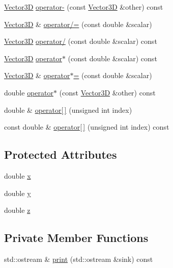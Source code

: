 \begin{DoxyCompactItemize}
\item 
\mbox{\hyperlink{classVector3D}{Vector3D}} \mbox{\hyperlink{classVector3D_a2d77fde2d4f484a639cb4dfd500c3540}{operator-\/}} (const \mbox{\hyperlink{classVector3D}{Vector3D}} \&other) const
\item 
\mbox{\hyperlink{classVector3D}{Vector3D}} \& \mbox{\hyperlink{classVector3D_ac916f188b52f903688d475d8aa6c17fa}{operator/=}} (const double \&scalar)
\item 
\mbox{\hyperlink{classVector3D}{Vector3D}} \mbox{\hyperlink{classVector3D_a1cc502ec8678ad1b6655dba2b840642c}{operator/}} (const double \&scalar) const
\item 
\mbox{\hyperlink{classVector3D}{Vector3D}} \mbox{\hyperlink{classVector3D_ad27fdc97ad2e142ccb6261759e481b1f}{operator$\ast$}} (const double \&scalar) const
\item 
\mbox{\hyperlink{classVector3D}{Vector3D}} \& \mbox{\hyperlink{classVector3D_a30e301e07305ca5eb90d33296d53dc04}{operator$\ast$=}} (const double \&scalar)
\item 
double \mbox{\hyperlink{classVector3D_a4086e97bd4845c0934a023d59b71ebc1}{operator$\ast$}} (const \mbox{\hyperlink{classVector3D}{Vector3D}} \&other) const
\item 
double \& \mbox{\hyperlink{classVector3D_a4dcadc12bb40086b075c9559b78ed8d2}{operator\mbox{[}$\,$\mbox{]}}} (unsigned int index)
\item 
const double \& \mbox{\hyperlink{classVector3D_acd83f7d07b4730cce2031ae0576095ac}{operator\mbox{[}$\,$\mbox{]}}} (unsigned int index) const
\end{DoxyCompactItemize}
\subsection*{Protected Attributes}
\begin{DoxyCompactItemize}
\item 
double \mbox{\hyperlink{classVector3D_a3c086dfccfc57dd996e9b8600098a430}{x}}
\item 
double \mbox{\hyperlink{classVector3D_adcec384756103d26d1181e45d5a0fd78}{y}}
\item 
double \mbox{\hyperlink{classVector3D_a7321f3ff785f275c4d83f7d1b951752a}{z}}
\end{DoxyCompactItemize}
\subsection*{Private Member Functions}
\begin{DoxyCompactItemize}
\item 
std\+::ostream \& \mbox{\hyperlink{classVector3D_a52019f23a845a14b8732fdd5a6ca2c16}{print}} (std\+::ostream \&sink) const
\end{DoxyCompactItemize}
